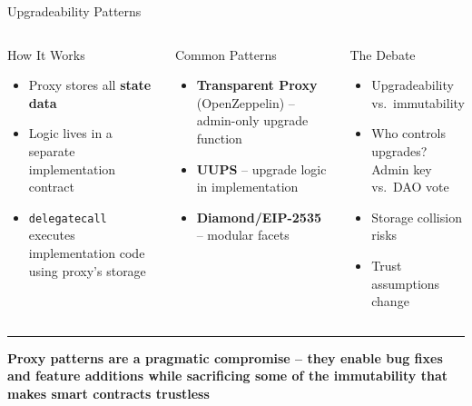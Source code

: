 \documentclass[8pt,aspectratio=169]{beamer}
\newcommand{\bottomnote}[1]{\vfill\vspace{-2mm}\textcolor{mllavender2}{\rule{\textwidth}{0.4pt}}\vspace{1mm}\footnotesize\textbf{#1}}
\begin{document}
\begin{frame}{Upgradeability Patterns}
\vspace{3mm}
\begin{columns}[T]
\begin{block}{\textcolor{mlblue}{How It Works}}
\footnotesize
\begin{itemize}
  \item Proxy stores all \textbf{state data}
  \item Logic lives in a separate implementation contract
  \item \texttt{delegatecall} executes implementation code using proxy's storage
\end{itemize}
\end{block}
\begin{block}{\textcolor{mlgreen}{Common Patterns}}
\footnotesize
\begin{itemize}
  \item \textbf{Transparent Proxy} (OpenZeppelin) -- admin-only upgrade function
  \item \textbf{UUPS} -- upgrade logic in implementation
  \item \textbf{Diamond/EIP-2535} -- modular facets
\end{itemize}
\end{block}
\begin{alertblock}{\textcolor{mlred}{The Debate}}
\footnotesize
\begin{itemize}
  \item Upgradeability vs.\ immutability
  \item Who controls upgrades? Admin key vs.\ DAO vote
  \item Storage collision risks
  \item Trust assumptions change
\end{itemize}
\end{alertblock}
\end{columns}
\bottomnote{Proxy patterns are a pragmatic compromise -- they enable bug fixes and feature additions while sacrificing some of the immutability that makes smart contracts trustless}
\end{frame}
\end{document}

